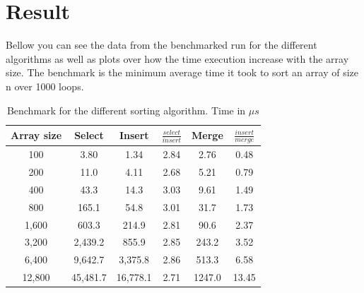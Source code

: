 \documentclass[a4paper,11pt]{article}
\begin{document}
\section*{Result}
Bellow you can see the data from the benchmarked run for the different algorithms as well as plots over how the time execution increase with the array size. The 
benchmark is the minimum average time it took to sort an array of size n over 1000 loops.
\begin{table}[h!]
    \begin{center}
        \begin{tabular}{|c|c|c|c|c|c|}
            \hline
            \textbf{Array size} & \textbf{Select} & \textbf{Insert} & \textbf{$\frac{select}{insert}$} & \textbf{Merge} & \textbf{$\frac{insert}{merge}$} \\
            \hline
            100                 & 3.80            & 1.34            & 2.84                             & 2.76           & 0.48                            \\
            200                 & 11.0            & 4.11            & 2.68                             & 5.21           & 0.79                            \\
            400                 & 43.3            & 14.3            & 3.03                             & 9.61           & 1.49                            \\
            800                 & 165.1           & 54.8            & 3.01                             & 31.7           & 1.73                            \\
            1,600               & 603.3           & 214.9           & 2.81                             & 90.6           & 2.37                            \\
            3,200               & 2,439.2         & 855.9           & 2.85                             & 243.2          & 3.52                            \\
            6,400               & 9,642.7         & 3,375.8         & 2.86                             & 513.3          & 6.58                            \\
            12,800              & 45,481.7        & 16,778.1        & 2.71                             & 1247.0         & 13.45                           \\
            \hline
        \end{tabular}
        \caption{Benchmark for the different sorting algorithm. Time in $\mu s$}
        \label{tab:benchmark}
    \end{center}
\end{table}
\end{document}

